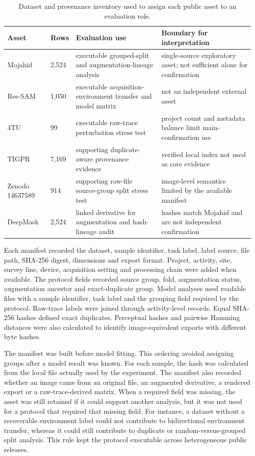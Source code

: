 \documentclass[]{interact}
\begin{document}
\begin{table}[H]
\caption{Dataset and provenance inventory used to assign each public asset to an evaluation role.}
\label{tab:asset_inventory}
\centering
\footnotesize
\setlength{\tabcolsep}{4pt}
\renewcommand{\arraystretch}{1.08}
\begin{tabular}{L{0.15\textwidth}L{0.10\textwidth}L{0.34\textwidth}L{0.31\textwidth}}
\toprule
Asset & Rows & Evaluation use & Boundary for interpretation \\
\midrule
Mojahid & 2,524 & executable grouped-split and augmentation-lineage analysis & single-source exploratory asset; not sufficient alone for confirmation \\
Res-SAM & 1,050 & executable acquisition-environment transfer and model matrix & not an independent external asset \\
4TU & 99 & executable raw-trace perturbation stress test & project count and metadata balance limit main-confirmation use \\
TIGPR & 7,169 & supporting duplicate-aware provenance evidence & verified local index not used as core evidence \\
Zenodo 14637589 & 914 & supporting raw-file source-group split stress test & image-level semantics limited by the available manifest \\
DeepMask & 2,524 & linked derivative for augmentation and hash-lineage audit & hashes match Mojahid and are not independent confirmation \\
\bottomrule
\end{tabular}
\end{table}

Each manifest recorded the dataset, sample identifier, task label, label source, file path, SHA-256 digest, dimensions and export format. Project, activity, site, survey line, device, acquisition setting and processing chain were added when available. The protocol fields recorded source group, fold, augmentation status, augmentation ancestor and exact-duplicate group. Model analyses used readable files with a sample identifier, task label and the grouping field required by the protocol. Raw-trace labels were joined through activity-level records. Equal SHA-256 hashes defined exact duplicates. Perceptual hashes and pairwise Hamming distances were also calculated to identify image-equivalent exports with different byte hashes.

The manifest was built before model fitting. This ordering avoided assigning groups after a model result was known. For each sample, the hash was calculated from the local file actually used by the experiment. The manifest also recorded whether an image came from an original file, an augmented derivative, a rendered export or a raw-trace-derived matrix. When a required field was missing, the asset was still retained if it could support another analysis, but it was not used for a protocol that required that missing field. For instance, a dataset without a recoverable environment label could not contribute to bidirectional environment transfer, whereas it could still contribute to duplicate or random-versus-grouped split analysis. This rule kept the protocol executable across heterogeneous public releases.
\end{document}
